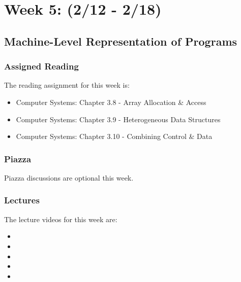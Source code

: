 \clearpage

\renewcommand{\ChapTitle}{Week 5: (2/12 - 2/18)}
\renewcommand{\SectionTitle}{Machine-Level Representation of Programs}

\chapter{\ChapTitle}

\section{\SectionTitle}

\subsection{Assigned Reading}

The reading assignment for this week is:

\begin{itemize}
    \item Computer Systems: Chapter 3.8 - Array Allocation \& Access
    \item Computer Systems: Chapter 3.9 - Heterogeneous Data Structures
    \item Computer Systems: Chapter 3.10 - Combining Control & Data
\end{itemize}

\subsection{Piazza}

Piazza discussions are optional this week. 

\subsection{Lectures}

The lecture videos for this week are:

\begin{itemize}
    \item {}
    \item {}
    \item {}
    \item {}
    \item {}
\end{itemize}

